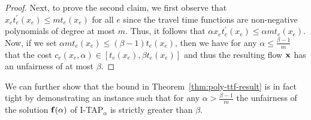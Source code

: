 \documentclass{article}
\newif\ifarxiv   %
\begin{document}
\begin{proof}
\ifarxiv
Next, to prove the second claim, we note that since the travel time function is a polynomial function of degree $m$, we can let $t_{e}\left(x_{e}\right)=\sum_{i=0}^{m} \gamma_{i} x_{e}^{i}$.
Then, we have:
\begin{align*}
x_{e} t_{e}^{\prime}\left(x_{e}\right) &=x_{e} \sum_{i=1}^{m} i \gamma_{i} x_{e}^{i-1} 
=\sum_{i=1}^{m} i \gamma_{i} x_{e}^{i} \\
& \leq m \sum_{i=1}^{m} \gamma_{i} x_{e}^{i}  \leq m \sum_{i=0}^{m} \gamma_{i} x_{e}^{i}  \\
&=m t_{e}\left(x_{e}\right).
\end{align*}
\else
Next, to prove the second claim, we first observe that $x_{e} t_{e}^{\prime}(x_e) \leq m t_{e}\left(x_{e}\right)$ for all $e$ since the travel time functions are non-negative polynomials of degree at most $m$. Thus, it follows that $\alpha x_e t_e^{\prime}(x_e) \leq \alpha m t_{e}\left(x_{e}\right)$. Now, if we set $\alpha m t_{e}\left(x_{e}\right) \leq (\beta-1)t_e(x_e)$, then we have for any $\alpha \leq \frac{\beta - 1}{m}$ that the cost $c_e(x_e, \alpha) \in [t_e(x_e), \beta t_e(x_e)]$ and thus the resulting flow $\mathbf{x}$ has an unfairness of at most $\beta$.
\fi
\ifarxiv
Note that we used the fact that $\gamma_0 \geq 0$ in the second inequality, which follows since $t_e(x_e) \geq 0$ for all $x_e \in \mathbb{R}_{\geq 0}$. From the above inequalities, we note that $\alpha x_e t_e^{\prime}(x_e) \leq \alpha m t_{e}\left(x_{e}\right)$. Now, if we set $\alpha m t_{e}\left(x_{e}\right) \leq (\beta-1)t_e(x_e)$, then we have for any $\alpha \leq \frac{\beta - 1}{m}$ that the cost $c_e(x_e, \alpha) \in [t_e(x_e), \beta t_e(x_e)]$ and thus the resulting flow $\f$ has an unfairness of at most $\beta$.
\fi
\end{proof}
\ifarxiv Theorem~\ref{thm:poly-ttf-result} establishes a relation between the convex combination parameter $\alpha$ and the level of unfairness of any optimal path flow $\f(\alpha)$ when the edge travel-time functions are polynomial.
\fi




We can further show that the bound \ifarxiv obtained \fi in Theorem~\ref{thm:poly-ttf-result} is in fact tight by demonstrating an instance such that for any $\alpha > \frac{\beta-1}{m}$ the unfairness of the solution $\f(\alpha)$ of I-TAP$_{\alpha}$ is strictly greater than $\beta$. %
\end{document}
